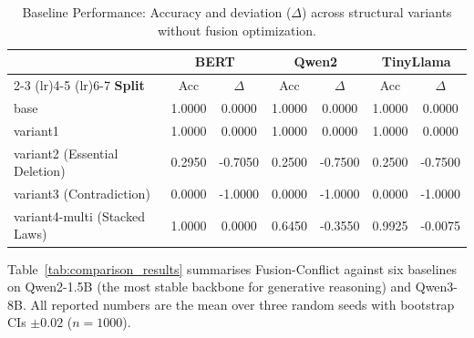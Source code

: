 \documentclass{article} %
\begin{document}
\begin{table}[t]
\centering
\small
\begin{tabular}{lcccccc}
\toprule
& \multicolumn{2}{c}{\textbf{BERT}} & 
  \multicolumn{2}{c}{\textbf{Qwen2}} &
  \multicolumn{2}{c}{\textbf{TinyLlama}} \\
\cmidrule(lr){2-3} \cmidrule(lr){4-5} \cmidrule(lr){6-7}
\textbf{Split} & Acc & $\Delta$ & Acc & $\Delta$ & Acc & $\Delta$ \\
\midrule
base                            & 1.0000 & 0.0000 & 1.0000 & 0.0000 & 1.0000 & 0.0000 \\
variant1                        & 1.0000 & 0.0000 & 1.0000 & 0.0000 & 1.0000 & 0.0000 \\
variant2 (Essential Deletion)   & 0.2950 & -0.7050 & 0.2500 & -0.7500 & 0.2500 & -0.7500 \\
variant3 (Contradiction)        & 0.0000 & -1.0000 & 0.0000 & -1.0000 & 0.0000 & -1.0000 \\
variant4-multi (Stacked Laws)   & 1.0000 & 0.0000 & 0.6450 & -0.3550 & 0.9925 & -0.0075 \\
\bottomrule
\end{tabular}
\caption{Baseline Performance: Accuracy and deviation ($\Delta$) across structural variants without fusion optimization.}
\label{tab:all_models_deltas}
\end{table}

Table~\ref{tab:comparison_results} summarises Fusion-Conflict against six baselines on Qwen2-1.5B (the most stable backbone for generative reasoning) and Qwen3-8B. All reported numbers are the mean over three random seeds with bootstrap CIs $\pm 0.02$ ($n{=}1000$).
\end{document}
